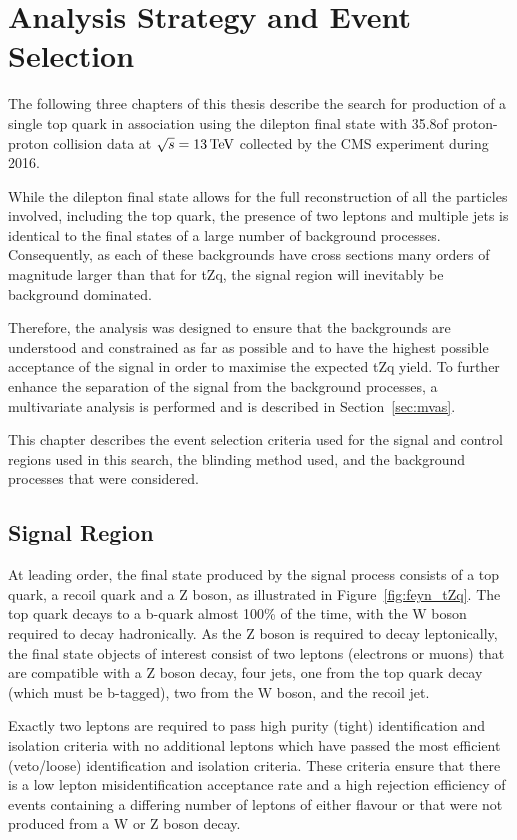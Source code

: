 \chapter{Analysis Strategy and Event Selection}\label{chapter:tzq-search}
The following three chapters of this thesis describe the search for production of a single top quark in association using the dilepton final state with 35.8\fbinv of proton-proton collision data at $\sqrt{s} = 13\,\text{Te\hspace{-.08em}V}$ collected by the CMS experiment during 2016.

While the dilepton final state allows for the full reconstruction of all the particles involved, including the top quark, the presence of two leptons and multiple jets is identical to the final states of a large number of background processes.
Consequently, as each of these backgrounds have cross sections many orders of magnitude larger than that for tZq, the signal region will inevitably be background dominated.

Therefore, the analysis was designed to ensure that the backgrounds are understood and constrained as far as possible and to have the highest possible acceptance of the signal in order to maximise the expected tZq yield.
To further enhance the separation of the signal from the background processes, a multivariate analysis is performed and is described in Section~\ref{sec:mvas}.

This chapter describes the event selection criteria used for the signal and control regions used in this search, the blinding method used, and the background processes that were considered.

\section{Signal Region}\label{sec:signalRegion}
At leading order, the final state produced by the signal process consists of a top quark, a recoil quark and a Z boson, as illustrated in Figure~\ref{fig:feyn_tZq}.
The top quark decays to a b-quark almost 100\% of the time, with the W boson required to decay hadronically.
As the Z boson is required to decay leptonically, the final state objects of interest consist of two leptons (electrons or muons) that are compatible with a Z boson decay, four jets, one from the top quark decay (which must be b-tagged), two from the W boson, and the recoil jet.

Exactly two leptons are required to pass high purity (tight) identification and isolation criteria with no additional leptons which have passed the most efficient (veto/loose) identification and isolation criteria.
These criteria ensure that there is a low lepton misidentification acceptance rate and a high rejection efficiency of events containing a differing number of leptons of either flavour or that were not produced from a W or Z boson decay.

